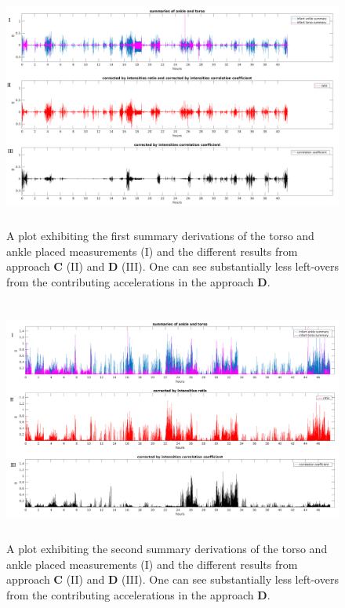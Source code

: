 \documentclass{article}
\begin{document}
{\begin{figure}[h!]
\includegraphics[width=15cm, height=8cm]{CorrectedIntensitiesCorrelation_result.png}
\caption{A plot exhibiting the first summary derivations of the torso and ankle placed measurements (I) and the different results from approach \textbf{C} (II) and \textbf{D} (III). One can see substantially less left-overs from the contributing accelerations in the approach \textbf{D}.}
\end{figure}

\begin{figure}[h!]
\includegraphics[width=15cm, height=8cm]{approachD_second_summary.png}
\caption{A plot exhibiting the second summary derivations of the torso and ankle placed measurements (I) and the different results from approach \textbf{C} (II) and \textbf{D} (III). One can see substantially less left-overs from the contributing accelerations in the approach \textbf{D}.}
\end{figure}
\\

}
\end{document}
